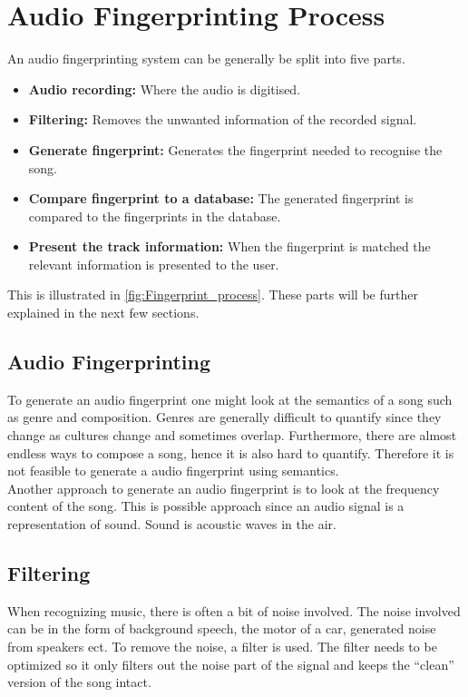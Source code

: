 \section{Audio Fingerprinting Process}
An audio fingerprinting system can be generally be split into five parts.
\begin{itemize}
    \item \textbf{Audio recording:} Where the audio is digitised.
    \item \textbf{Filtering:} Removes the unwanted information of the recorded signal.
    \item \textbf{Generate fingerprint:} Generates the fingerprint needed to recognise the song.
    \item \textbf{Compare fingerprint to a database:} The generated fingerprint is compared to the fingerprints in the database.
    \item \textbf{Present the track information:} When the fingerprint is matched the relevant information is presented to the user.
\end{itemize}
This is illustrated in \autoref{fig:Fingerprint_process}.
These parts will be further explained in the next few sections.
   


\subsection{Audio Fingerprinting}
To generate an audio fingerprint one might look at the semantics of a song such as genre and composition. Genres are generally difficult to quantify since they change as cultures change and sometimes overlap. Furthermore, there are almost endless ways to compose a song, hence it is also hard to quantify. Therefore it is not feasible to generate a audio fingerprint using semantics.\\
Another approach to generate an audio fingerprint is to look at the frequency content of the song. This is possible approach since an audio signal is a representation of sound. Sound is acoustic waves in the air. 

\subsection{Filtering}
When recognizing music, there is often a bit of noise involved. The noise involved can be in the form of background speech, the motor of a car, generated noise from speakers ect. To remove the noise, a filter is used. The filter needs to be optimized so it only filters out the noise part of the signal and keeps the “clean” version of the song intact.\\

